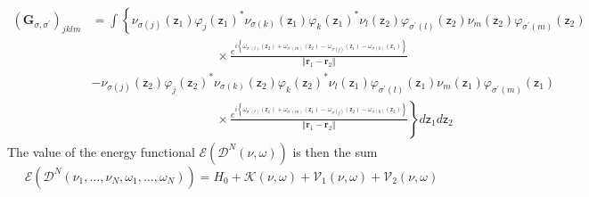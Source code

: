 \documentclass[aps,preprint]{revtex4}%
\begin{document}
\begin{align}
\left(  \mathbf{G}_{\sigma,\sigma^{\prime}}\right)  _{jklm}  &  =%
{\displaystyle\int}
\left\{  \nu_{\sigma\left(  j\right)  }\left(  \mathsf{z}_{1}\right)
\varphi_{j}\left(  \mathsf{z}_{1}\right)  ^{\ast}\nu_{\sigma\left(  k\right)
}\left(  \mathsf{z}_{1}\right)  \varphi_{k}\left(  \mathsf{z}_{1}\right)
^{\ast}\nu_{l}\left(  \mathsf{z}_{2}\right)  \varphi_{\sigma^{\prime}\left(
l\right)  }\left(  \mathsf{z}_{2}\right)  \nu_{m}\left(  \mathsf{z}%
_{2}\right)  \varphi_{\sigma^{\prime}\left(  m\right)  }\left(  \mathsf{z}%
_{2}\right)  \right. \nonumber\\
&  \qquad\qquad\qquad\qquad\qquad\times\frac{e^{i\left\{  \omega
_{\sigma^{\prime}\left(  l\right)  }\left(  \mathsf{z}_{2}\right)
+\omega_{\sigma^{\prime}\left(  m\right)  }\left(  \mathsf{z}_{2}\right)
-\,\omega_{\sigma\left(  j\right)  }\left(  \mathsf{z}_{1}\right)
-\omega_{\sigma\left(  k\right)  }\left(  \mathsf{z}_{1}\right)  \right\}  }%
}{\left\Vert \mathbf{r}_{1}-\mathbf{r}_{2}\right\Vert }\nonumber\\
&  -\nu_{\sigma\left(  j\right)  }\left(  \mathsf{z}_{2}\right)  \varphi
_{j}\left(  \mathsf{z}_{2}\right)  ^{\ast}\nu_{\sigma\left(  k\right)
}\left(  \mathsf{z}_{2}\right)  \varphi_{k}\left(  \mathsf{z}_{2}\right)
^{\ast}\nu_{l}\left(  \mathsf{z}_{1}\right)  \varphi_{\sigma^{\prime}\left(
l\right)  }\left(  \mathsf{z}_{1}\right)  \nu_{m}\left(  \mathsf{z}%
_{1}\right)  \varphi_{\sigma^{\prime}\left(  m\right)  }\left(  \mathsf{z}%
_{1}\right) \nonumber\\
&  \qquad\qquad\qquad\qquad\qquad\times\left.  \frac{e^{i\left\{
\omega_{\sigma^{\prime}\left(  l\right)  }\left(  \mathsf{z}_{1}\right)
+\omega_{\sigma^{\prime}\left(  m\right)  }\left(  \mathsf{z}_{1}\right)
-\,\omega_{\sigma\left(  j\right)  }\left(  \mathsf{z}_{2}\right)
-\omega_{\sigma\left(  k\right)  }\left(  \mathsf{z}_{2}\right)  \right\}  }%
}{\left\Vert \mathbf{r}_{1}-\mathbf{r}_{2}\right\Vert }\right\}
d\mathsf{z}_{1}d\mathsf{z}_{2}%
\end{align}
The value of the energy functional $\mathcal{E}\left(  \mathcal{D}^{N}\left(
\nu,\omega\right)  \right)  $ is then the sum
\begin{equation}
\mathcal{E}\left(  \mathcal{D}^{N}\left(  \nu_{1},\ldots,\nu_{N},\omega
_{1},\ldots,\omega_{N}\right)  \right)  =H_{0}+\mathcal{K}\left(  \nu
,\omega\right)  +\mathcal{V}_{1}\left(  \nu,\omega\right)  +\mathcal{V}%
_{2}\left(  \nu,\omega\right)
\end{equation}
\end{document}
